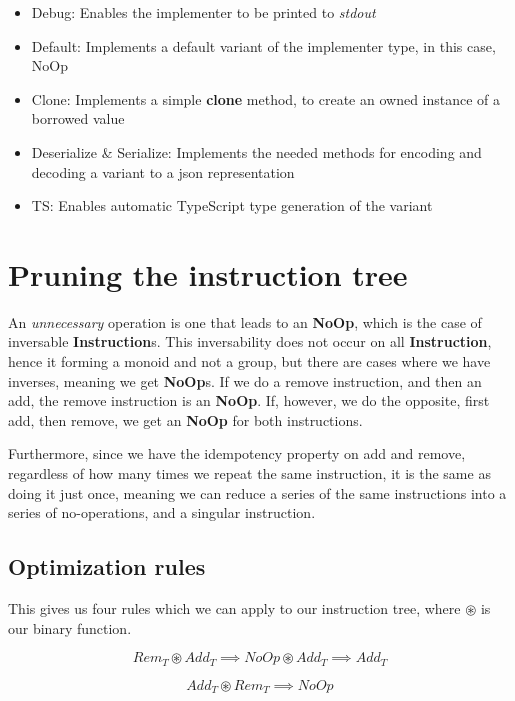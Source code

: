 \begin{itemize}
  \item Debug: Enables the implementer to be printed to \textit{stdout}
  \item Default: Implements a default variant of the implementer type, in this
    case, NoOp
  \item Clone: Implements a simple \textbf{clone} method, to create an owned
    instance of a borrowed value
  \item Deserialize \& Serialize: Implements the needed methods for encoding
    and decoding a variant to a \gls{json} representation
  \item TS: Enables automatic TypeScript type generation of the variant
\end{itemize}


\section{Pruning the instruction tree}

An \textit{unnecessary} operation is one that leads to an \textbf{NoOp}, which
is the case of inversable \textbf{Instruction}s. This inversability does not
occur on all \textbf{Instruction}, hence it forming a monoid and not a group,
but there are cases where we have inverses, meaning we get \textbf{NoOp}s. If we
do a remove instruction, and then an add, the remove instruction is an
\textbf{NoOp}. If, however, we do the opposite, first add, then remove, we get
an \textbf{NoOp} for both instructions.

Furthermore, since we have the idempotency property on add and remove,
regardless of how many times we repeat the same instruction, it is the same as
doing it just once, meaning we can reduce a series of the same instructions into
a series of no-operations, and a singular instruction.


\subsection{Optimization rules}

This gives us four rules which we can apply to our instruction tree, where
$\circledast$ is our binary function.

\begin{equation} \label{eq:apx1}
  Rem_T \circledast Add_T \implies NoOp \circledast Add_T \implies Add_T
\end{equation}

\begin{equation} \label{eq:apx2}
  Add_T \circledast Rem_T \implies NoOp
\end{equation}

